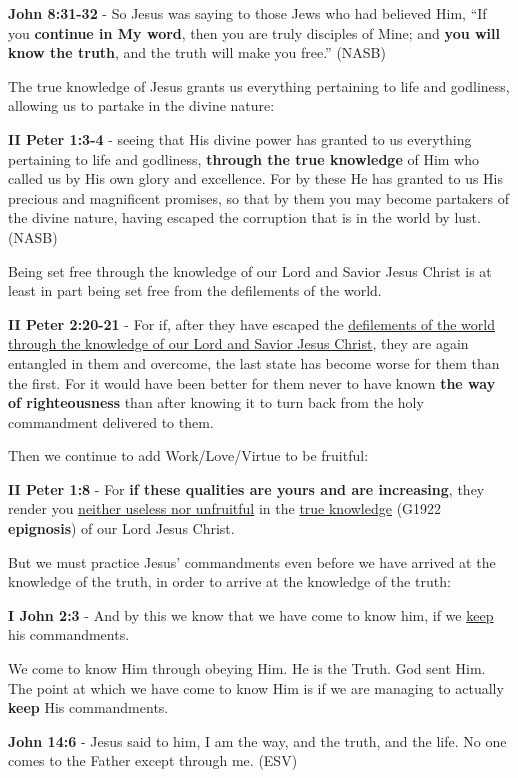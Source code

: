 \documentclass[11pt]{article}
\begin{document}
\textbf{John 8:31-32} - So Jesus was saying to those Jews who had believed Him, “If you \textbf{continue in My word}, then you are truly disciples of Mine; and \textbf{you will know the truth}, and the truth will make you free.” (NASB)

The true knowledge of Jesus grants us everything pertaining to life and godliness, allowing us to partake in the divine nature:

\textbf{II Peter 1:3-4} - seeing that His divine power has granted to us everything pertaining to life and godliness, \textbf{through the true knowledge} of Him who called us by His own glory and excellence. For by these He has granted to us His precious and magnificent promises, so that by them you may become partakers of the divine nature, having escaped the corruption that is in the world by lust. (NASB)

Being set free through the knowledge of our Lord and Savior Jesus Christ is at least in part being set free from the defilements of the world.

\textbf{II Peter 2:20-21} - For if, after they have escaped the \uline{defilements of the world through the knowledge of our Lord and Savior Jesus Christ}, they are again entangled in them and overcome, the last state has become worse for them than the first. For it would have been better for them never to have known \textbf{the way of righteousness} than after knowing it to turn back from the holy commandment delivered to them.

Then we continue to add Work/Love/Virtue to be fruitful:

\textbf{II Peter 1:8} - For \textbf{if these qualities are yours and are increasing}, they render you \uline{neither useless nor unfruitful} in the \uline{true knowledge} (G1922 \textbf{epignosis}) of our Lord Jesus Christ.

But we must practice Jesus' commandments even before we have arrived at the knowledge of the truth, in order to arrive at the knowledge of the truth:

\textbf{I John 2:3} - And by this we know that we have come to know him, if we \uline{keep} his commandments.

We come to know Him through obeying Him. He is the Truth. God sent Him.
The point at which we have come to know Him is if we are managing to actually \textbf{keep} His commandments.

\textbf{John 14:6} - Jesus said to him, I am the way, and the truth, and the life. No one comes to the Father except through me. (ESV)
\end{document}

